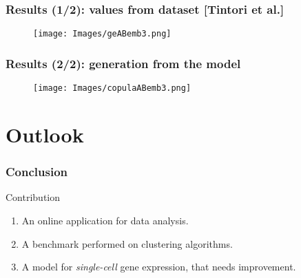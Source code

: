 \documentclass{beamer}
\begin{document}
\begin{frame}
\frametitle{Results (1/2): values from dataset \textbf{[Tintori et al.]}}

\begin{figure}
\centering
\texttt{[image: Images/geABemb3.png]}
\end{figure}

\end{frame}

\begin{frame}
\frametitle{Results (2/2): generation from the model}

\begin{figure}
\centering
\texttt{[image: Images/copulaABemb3.png]}
\end{figure}

\end{frame}

\section{Outlook}

\begin{frame}
\tableofcontents[currentsection]
\end{frame}

\begin{frame}
\frametitle{Conclusion}

\begin{block}{Contribution}
\bigskip
\begin{enumerate}[<+>]
\item An online application for data analysis.
\bigskip
\item A benchmark performed on clustering algorithms.
\bigskip
\item A model for \textit{single-cell} gene expression, that needs improvement.
\end{enumerate}
\bigskip
\end{block}

\end{frame}
\end{document}
